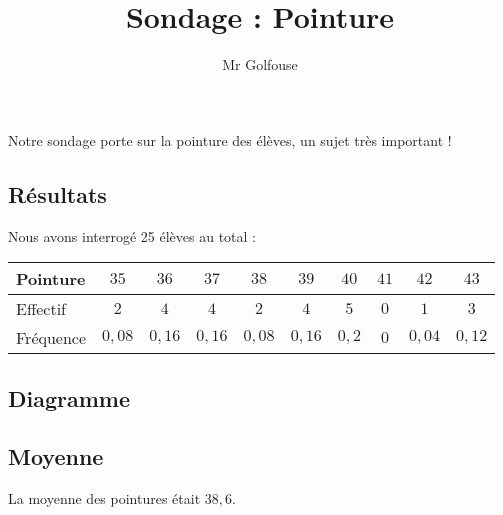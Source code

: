 \documentclass[a4paper,12pt]{article}
\title{Sondage : Pointure}
\author{Mr Golfouse}
\date{}
\begin{document}
\maketitle

Notre sondage porte sur la pointure des élèves, un sujet très important !

\subsection*{Résultats}

Nous avons interrogé 25 élèves au total :

\begin{center}
	\begin{tabular}{|l|c|c|c|c|c|c|c|c|c|}
		\hline
		Pointure  & $35$     & $36$     & $37$     & $38$     & $39$     & $40$    & $41$               & $42$     & $43$
		\\ \hline
		Effectif  & $2$      & $4$      & $4$      & $2$      & $4$      & $5$     & $0$                & $1$      & $3$
		\\ \hline
		Fréquence & $0{,}08$ & $0{,}16$ & $0{,}16$ & $0{,}08$ & $0{,}16$ & $0{,}2$ & \phantom{$0$}$0$\phantom{$0$} & $0{,}04$ & $0{,}12$
		\\ \hline
	\end{tabular}
\end{center}

\subsection*{Diagramme}

\begin{center}
\end{center}

\subsection*{Moyenne}

La moyenne des pointures était $38{,}6$.
\end{document}
